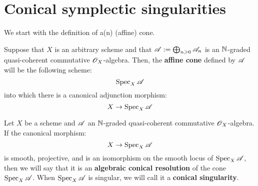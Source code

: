     \section{Conical symplectic singularities}
        We start with the definition of a(n) (affine) cone.
        \begin{definition} \label{def: affine_cones}
            Suppose that $X$ is an arbitrary scheme and that $\mathscr{A} := \bigoplus_{n \geqslant 0} \mathscr{A}_n$ is an $\mathbb{N}$-graded quasi-coherent commutative $\mathscr{O}_X$-algebra. Then, the \textbf{affine cone} defined by $\mathscr{A}$ will be the following scheme:
                $$\operatorname{Spec}_X \mathscr{A}$$
            into which there is a canonical adjunction morphism:
                $$X \to \operatorname{Spec}_X \mathscr{A}$$
        \end{definition}
        \begin{definition} \label{def: affine_conical_singularities_and_resolutions}
            Let $X$ be a scheme and $\mathscr{A}$ an $\mathbb{N}$-graded quasi-coherent commutative $\mathscr{O}_X$-algebra. If the canonical morphism:
                $$X \to \operatorname{Spec}_X \mathscr{A}$$
            is smooth, projective, and is an isomorphism on the smooth locus of $\operatorname{Spec}_X \mathscr{A}$, then we will say that it is an \textbf{algebraic conical resolution} of the cone $\operatorname{Spec}_X \mathscr{A}$. When $\operatorname{Spec}_X \mathscr{A}$ is singular, we will call it a \textbf{conical singularity}.
        \end{definition}
        \begin{definition} \label{def: affine_conical_symplectic_singularities_and_resolutions}
            
        \end{definition}
        \begin{example}
            
        \end{example}
    
    \printbibliography

